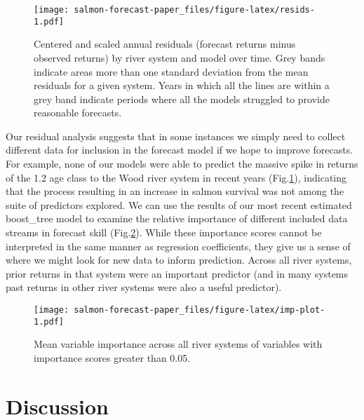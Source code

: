 \documentclass[
]{article}
\begin{document}
\begin{figure}
\centering
\texttt{[image: salmon-forecast-paper\_files/figure-latex/resids-1.pdf]}
\caption{\label{fig:resids}Centered and scaled annual residuals (forecast returns minus observed returns) by river system and model over time. Grey bands indicate areas more than one standard deviation from the mean residuals for a given system. Years in which all the lines are within a grey band indicate periods where all the models struggled to provide reasonable forecasts.}
\end{figure}

Our residual analysis suggests that in some instances we simply need to collect different data for inclusion in the forecast model if we hope to improve forecasts. For example, none of our models were able to predict the massive spike in returns of the 1.2 age class to the Wood river system in recent years (Fig.\ref{fig:resids}), indicating that the process resulting in an increase in salmon survival was not among the suite of predictors explored. We can use the results of our most recent estimated boost\_tree model to examine the relative importance of different included data streams in forecast skill (Fig.\ref{fig:imp-plot}). While these importance scores cannot be interpreted in the same manner as regression coefficients, they give us a sense of where we might look for new data to inform prediction. Across all river systems, prior returns in that system were an important predictor (and in many systems past returns in other river systems were also a useful predictor).

\begin{figure}
\centering
\texttt{[image: salmon-forecast-paper\_files/figure-latex/imp-plot-1.pdf]}
\caption{\label{fig:imp-plot}Mean variable importance across all river systems of variables with importance scores greater than 0.05.}
\end{figure}

\hypertarget{discussion}{%
\section*{Discussion}\label{discussion}}
\end{document}
